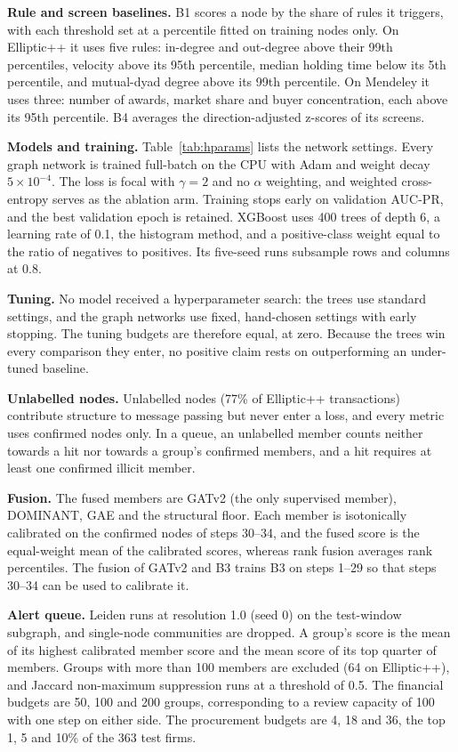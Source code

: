 \documentclass[conference]{IEEEtran}
\begin{document}
\textbf{Rule and screen baselines.} B1 scores a node by the share of rules it
triggers, with each threshold set at a percentile fitted on training nodes only.
On Elliptic++ it uses five rules: in-degree and out-degree above their 99th
percentiles, velocity above its 95th percentile, median holding time below its
5th percentile, and mutual-dyad degree above its 99th percentile. On Mendeley it
uses three: number of awards, market share and buyer concentration, each above
its 95th percentile. B4 averages the direction-adjusted z-scores of its
screens.

\textbf{Models and training.} Table~\ref{tab:hparams} lists the network
settings. Every graph network is trained full-batch on the CPU with Adam and
weight decay $5 \times 10^{-4}$. The loss is focal with $\gamma = 2$ and no
$\alpha$ weighting, and weighted cross-entropy serves as the ablation arm.
Training stops early on validation AUC-PR, and the best validation epoch is
retained. XGBoost uses 400 trees of depth 6, a learning rate of 0.1, the
histogram method, and a positive-class weight equal to the ratio of negatives
to positives. Its five-seed runs subsample rows and columns at 0.8.

\textbf{Tuning.} No model received a hyperparameter search: the trees use
standard settings, and the graph networks use fixed, hand-chosen settings with
early stopping. The tuning budgets are therefore equal, at zero. Because the
trees win every comparison they enter, no positive claim rests on outperforming
an under-tuned baseline.

\textbf{Unlabelled nodes.} Unlabelled nodes (77\% of Elliptic++ transactions)
contribute structure to message passing but never enter a loss, and every
metric uses confirmed nodes only. In a queue, an unlabelled member counts
neither towards a hit nor towards a group's confirmed members, and a hit
requires at least one confirmed illicit member.

\textbf{Fusion.} The fused members are GATv2 (the only supervised member),
DOMINANT, GAE and the structural floor. Each member is isotonically calibrated
on the confirmed nodes of steps 30--34, and the fused score is the equal-weight
mean of the calibrated scores, whereas rank fusion averages rank percentiles.
The fusion of GATv2 and B3 trains B3 on steps 1--29 so that steps 30--34 can be
used to calibrate it.

\textbf{Alert queue.} Leiden runs at resolution 1.0 (seed 0) on the
test-window subgraph, and single-node communities are dropped. A group's score
is the mean of its highest calibrated member score and the mean score of its
top quarter of members. Groups with more than 100 members are excluded (64 on
Elliptic++), and Jaccard non-maximum suppression runs at a threshold of 0.5.
The financial budgets are 50, 100 and 200 groups, corresponding to a review
capacity of 100 with one step on either side. The procurement budgets are 4, 18
and 36, the top 1, 5 and 10\% of the 363 test firms.
\end{document}
